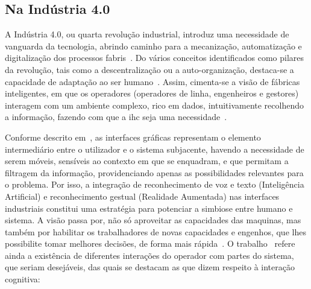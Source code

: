 \subsection{Na Indústria 4.0}
A Indústria 4.0, ou quarta revolução industrial, introduz uma necessidade de vanguarda da tecnologia, abrindo caminho para a mecanização, automatização e digitalização dos processos fabris~\parencite{industry40}. Do vários conceitos identificados como pilares da revolução, tais como a descentralização ou a auto-organização, destaca-se a capacidade de adaptação ao ser humano~\parencite{intelligent_manufacturing_context_industry40_review, industry40}. Assim, cimenta-se a visão de fábricas inteligentes, em que os operadores (operadores de linha, engenheiros e gestores) interagem com um ambiente complexo, rico em dados, intuitivamente recolhendo a informação, fazendo com que a \gls{ihc} seja uma necessidade~\parencite{social_factory, hmi_industry40}.

Conforme descrito em~\textcite{hmi_industry40}, as interfaces gráficas representam o elemento intermediário entre o utilizador e o sistema subjacente, havendo a necessidade de serem móveis, sensíveis ao contexto em que se enquadram, e que permitam a filtragem da informação, providenciando apenas as possibilidades relevantes para o problema. Por isso, a integração de reconhecimento de voz e texto (Inteligência Artificial) e reconhecimento gestual (Realidade Aumentada) nas interfaces industriais constitui uma estratégia para potenciar a simbiose entre humano e sistema. A visão passa por, não só aproveitar as capacidades das maquinas, mas também por habilitar os trabalhadores de novas capacidades e engenhos, que lhes possibilite tomar melhores decisões, de forma mais rápida~\parencite{towards_operator_40_typology}. O trabalho~\textcite{towards_operator_40_typology} refere ainda a existência de diferentes interações do operador com partes do sistema, que seriam desejáveis, das quais se destacam as que dizem respeito à interação cognitiva:

